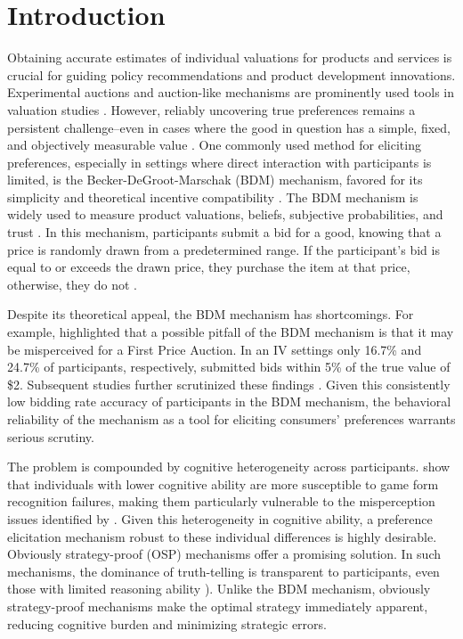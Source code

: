 \documentclass[12pt]{article}
\begin{document}
\section{Introduction}
Obtaining accurate estimates of individual valuations for products and services is crucial for guiding policy recommendations and product development innovations. Experimental auctions and auction-like mechanisms are prominently used tools in valuation studies \citep{lusk2007experimental,canavari2019run}. However, reliably uncovering true preferences remains a persistent challenge--even in cases where the good in question has a simple, fixed, and objectively measurable value \citep{drichoutis2022game, cason_misconceptions_2014}. One commonly used method for eliciting preferences, especially in settings where direct interaction with participants is limited, is the Becker-DeGroot-Marschak (BDM) mechanism,  favored for its simplicity and theoretical incentive compatibility \citep{mamadehussene2023reliability, azrieli2018incentives}. The BDM mechanism is widely used to measure product valuations, beliefs, subjective probabilities, and trust  \citep{mamadehussene2023reliability, ahles_testing_2024, burdea2022online}. In this mechanism, participants submit a bid for a good, knowing that a price is randomly drawn from a predetermined range. If the participant's bid is equal to or exceeds the drawn price, they purchase the item at that price, otherwise, they do not \citep{becker_measuring_1964}.

Despite its theoretical appeal, the BDM mechanism has shortcomings. For example, 
\citet{cason_misconceptions_2014} highlighted that a possible pitfall of the BDM mechanism is that it may be misperceived for a First Price Auction. In an IV settings only 16.7\% and 24.7\% of participants, respectively, submitted bids within 5\% of the true value of \$2.
Subsequent studies further scrutinized these findings \citep{DrichoutisEtAl2024incentives,bull2019failure,martin2022cognitive}. Given this consistently low bidding rate accuracy of participants in the BDM mechanism, the behavioral reliability of the mechanism as a tool for eliciting consumers' preferences warrants serious scrutiny.

The problem is compounded by cognitive heterogeneity across participants. \citet{drichoutis2022game} show that individuals with lower cognitive ability are more susceptible to game form recognition failures, making them particularly vulnerable to the misperception issues identified by \citet{cason_misconceptions_2014}. Given this heterogeneity in cognitive ability, a preference elicitation mechanism robust to these individual differences is highly desirable.
Obviously strategy-proof (OSP) mechanisms offer a promising solution. In such mechanisms, the dominance of truth-telling is transparent to participants, even those with limited reasoning ability \citep{li_obviously_2017}). Unlike the BDM mechanism, obviously strategy-proof mechanisms make the optimal strategy immediately apparent, reducing cognitive burden and minimizing strategic errors.
\end{document}
